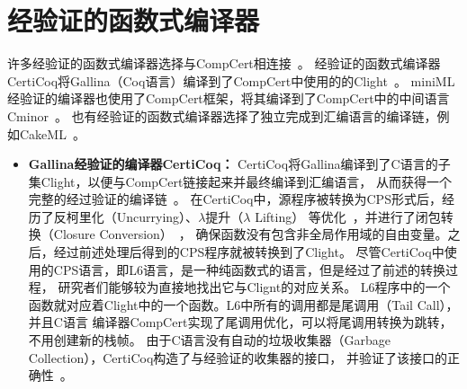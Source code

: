 \section{经验证的函数式编译器} \label{sec:relatedf}

许多经验证的函数式编译器选择与CompCert相连接~\cite{belanger2019certified, dargaye2009verification}。
经验证的函数式编译器CertiCoq将Gallina（Coq语言）编译到了CompCert中使用的的Clight~\cite{belanger2019certified}。
miniML经验证的编译器也使用了CompCert框架，将其编译到了CompCert中的中间语言Cminor~\cite{dargaye2009verification}。
也有经验证的函数式编译器选择了独立完成到汇编语言的编译链，例如CakeML~\cite{cakeml2016}。

\begin{itemize}
    \item \textbf{Gallina经验证的编译器CertiCoq：} 
    CertiCoq将Gallina编译到了C语言的子集Clight，以便与CompCert链接起来并最终编译到汇编语言，
    从而获得一个完整的经过验证的编译链~\cite{belanger2019certified,zoe-oopsla2021,zoe-icfp2021}。
    在CertiCoq中，源程序被转换为CPS形式后，经历了反柯里化（Uncurrying）、$\lambda$提升（$\lambda$ Lifting）
    等优化~\cite{li2018verifying}，并进行了闭包转换（Closure Conversion）~\cite{paraskevopoulou2019closure}，
    确保函数没有包含非全局作用域的自由变量。之后，经过前述处理后得到的CPS程序就被转换到了Clight。
    尽管CertiCoq中使用的CPS语言，即L6语言，是一种纯函数式的语言，但是经过了前述的转换过程，
    研究者们能够较为直接地找出它与Clignt的对应关系。
    L6程序中的一个函数就对应着Clight中的一个函数。L6中所有的调用都是尾调用（Tail Call），并且C语言
    编译器CompCert实现了尾调用优化，可以将尾调用转换为跳转，不用创建新的栈帧。
    由于C语言没有自动的垃圾收集器（Garbage Collection），CertiCoq构造了与经验证的收集器的接口，
    并验证了该接口的正确性~\cite{wang2019certifying}。


\end{itemize}
